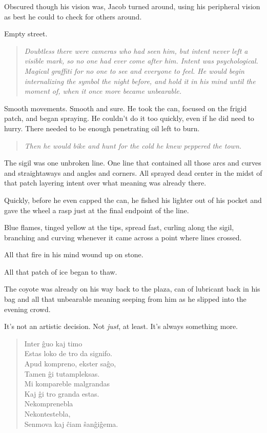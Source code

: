 \begin{paracol}{2}
\begin{rightcolumn}
    Obscured though his vision was, Jacob turned around, using his peripheral vision as best he could to check for others around.

    Empty street.

    \begin{quote}
    \emph{Doubtless there were cameras who had seen him, but intent never left a visible mark, so no one had ever come after him. Intent was psychological. Magical graffiti for no one to see and everyone to feel. He would begin internalizing the symbol the night before, and hold it in his mind until the moment of, when it once more became unbearable.}
    \end{quote}

    Smooth movements. Smooth and sure. He took the can, focused on the frigid patch, and began spraying. He couldn't do it too quickly, even if he did need to hurry. There needed to be enough penetrating oil left to burn.

    \begin{quote}
    \emph{Then he would bike and hunt for the cold he knew peppered the town.}
    \end{quote}

    The sigil was one unbroken line. One line that contained all those arcs and curves and straightaways and angles and corners. All sprayed dead center in the midst of that patch layering intent over what meaning was already there.

    Quickly, before he even capped the can, he fished his lighter out of his pocket and gave the wheel a rasp just at the final endpoint of the line.

    Blue flames, tinged yellow at the tips, spread fast, curling along the sigil, branching and curving whenever it came across a point where lines crossed.

    All that fire in his mind wound up on stone.

    All that patch of ice began to thaw.

    The coyote was already on his way back to the plaza, can of lubricant back in his bag and all that unbearable meaning seeping from him as he slipped into the evening crowd.

\end{rightcolumn}
\begin{leftcolumn}
It's not an artistic decision. Not \emph{just}, at least. It's always something more.

\begin{verse}
Inter ĝuo kaj timo\\
Estas loko de tro da signifo.\\
Apud kompreno, ekster saĝo,\\
Tamen ĝi tutampleksas.\\
Mi kompareble malgrandas\\
Kaj ĝi tro granda estas.\\
Nekomprenebla\\
Nekontestebla,\\
Senmova kaj ĉiam ŝanĝiĝema.


\end{verse}
\end{leftcolumn}
\end{paracol}
